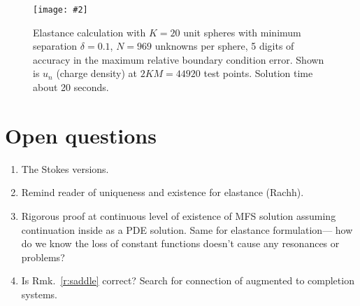 \documentclass[10pt]{article}
\newcommand{\ben}{\begin{enumerate}}
\newcommand{\een}{\end{enumerate}}
\newcommand{\bfi}{\begin{figure}}
\newcommand{\efi}{\end{figure}}
\newcommand{\ca}[2]{\caption{#1 \label{#2}}}
\newcommand{\ig}[2]{\texttt{[image: \#2]}}
\begin{document}
\bfi
\centering \ig{width=5in}{un_K20_d0.1.png}
\ca{Elastance calculation with $K=20$ unit spheres with minimum separation
  $\delta=0.1$, $N=969$ unknowns per sphere, 5 digits of accuracy in the maximum relative boundary condition error. Shown is $u_n$ (charge density)
  at $2KM= 44920$ test points. Solution time about 20 seconds.}{f:elast}
\efi


\section{Open questions}

\ben
\item The Stokes versions.
\item Remind reader of uniqueness and existence for elastance (Rachh).
\item Rigorous proof at continuous level of existence of MFS solution assuming
  continuation inside as a PDE solution. Same for elastance formulation---%
  how do we know the loss of constant functions doesn't cause any resonances
  or problems?
\item Is Rmk.~\ref{r:saddle} correct? Search for connection
  of augmented to completion systems.
\een




\end{document}
